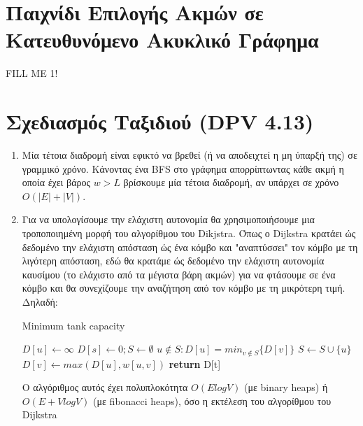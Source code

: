 \documentclass[a4paper,11pt]{article}
\begin{document}
\renewcommand{\labelenumi}{\roman{enumi})}
\renewcommand{\labelenumii}{ (\arabic{enumii}) }



\section{Παιχνίδι Επιλογής Ακμών σε Κατευθυνόμενο Ακυκλικό Γράφημα} \setcounter{section}{1}
FILL ME 1!


\section{Σχεδιασμός Ταξιδιού (DPV 4.13)}
\begin{enumerate}
\item Μία τέτοια διαδρομή είναι εφικτό να βρεθεί (ή να αποδειχτεί η μη ύπαρξή
της) σε γραμμικό χρόνο. Κάνοντας ένα BFS στο γράφημα απορρίπτωντας κάθε ακμή η
οποία έχει βάρος $w > L$ βρίσκουμε μία τέτοια διαδρομή, αν υπάρχει σε χρόνο
$O(|E| + |V|)$.
\item Για να υπολογίσουμε την ελάχιστη αυτονομία θα χρησιμοποιήσουμε μια
τροποποιημένη μορφή του αλγορίθμου του Dikjstra. Όπως ο Dijkstra κρατάει ώς
δεδομένο την ελάχιστη απόσταση ώς ένα κόμβο και "αναπτύσσει" τον κόμβο με τη
λιγότερη απόσταση, εδώ θα κρατάμε ώς δεδομένο την ελάχιστη αυτονομία καυσίμου
(το ελάχιστο από τα μέγιστα βάρη ακμών) για να φτάσουμε σε ένα κόμβο και θα
συνεχίζουμε την αναζήτηση από τον κόμβο με τη μικρότερη τιμή. Δηλαδή:
\begin{algorithm}[H]
\caption{Minimum tank capacity}
\begin{algorithmic}[1]
	    \State $D[u] \gets \infty$
	\EndFor
	\State $D[s] \gets 0 ; S \gets \emptyset$
	    \State $u \notin S : D[u] = min_{v \notin S}\{D[v]\}$
		\State $S \gets S \cup \{u\}$
	\EndWhile
			\State $D[v] \gets max(D[u], w[u,v])$
		\EndIf
	\EndFor
	\State \textbf{return} D[t]
\EndProcedure
\end{algorithmic}
\end{algorithm}

Ο αλγόριθμος αυτός έχει πολυπλοκότητα $O(ElogV)$ (με binary heaps) ή $O(E +
VlogV)$ (με fibonacci heaps), όσο η εκτέλεση του αλγορίθμου του Dijkstra
\end{enumerate}
\end{document}
